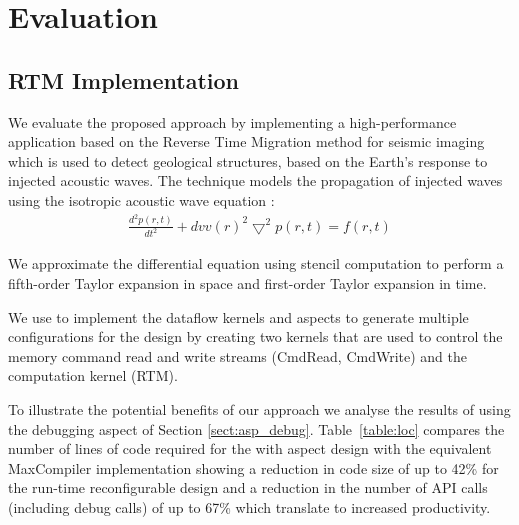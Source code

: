\chapter{Evaluation}
\label{sec:evaluation}

\section{RTM Implementation}
\label{sec:RTM}
We evaluate the proposed approach by implementing a high-performance
application based on the Reverse Time Migration method for seismic
imaging which is used to detect geological structures, based on the
Earth's response to injected acoustic waves. The technique models the
propagation of injected waves using the isotropic acoustic wave
equation \cite{araya2011assessing}:
\begin{align}
\frac{d^2p(r,t)}{dt^2} + {dvv(r)}^2\bigtriangledown^2p(r,t) = f(r,t)
\end{align}

We approximate the differential equation using stencil computation to
perform a fifth-order Taylor expansion in space and first-order Taylor
expansion in time.

We use \FAST{} to implement the dataflow kernels and aspects to
generate multiple configurations for the design by creating two
kernels that are used to control the memory command read and write
streams (CmdRead, CmdWrite) and the computation kernel (RTM).

To illustrate the potential benefits of our approach we analyse the
results of using the debugging aspect of Section
\ref{sect:asp_debug}. Table~\ref{table:loc} compares the number of
lines of code required for the \FAST{} with aspect design with the
equivalent MaxCompiler implementation showing a reduction in code size
of up to 42\% for the run-time reconfigurable design and a reduction
in the number of API calls (including debug calls) of up to 67\% which
translate to increased productivity.

